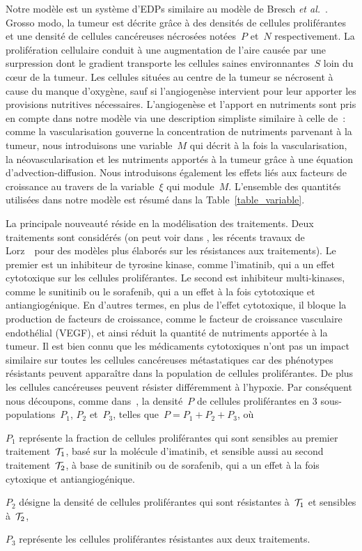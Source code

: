 \documentclass[main.tex]{subfiles}
\begin{document}
Notre modèle est un système d'EDPs similaire au modèle de 
Bresch {\it et al.}~\cite{Bresch2010}. Grosso modo, la tumeur est décrite grâce à des densités de cellules proliférantes et une densité de cellules cancéreuses nécrosées notées~$P$ et~$N$ respectivement. 
La prolifération cellulaire conduit à une augmentation de l'aire causée par une surpression dont le gradient transporte les cellules saines environnantes~$S$ loin du c\oe{}ur de la tumeur. 
Les cellules situées au centre de la tumeur se nécrosent à cause du manque d'oxygène, sauf si l'angiogenèse intervient pour leur apporter les provisions nutritives nécessaires.
L'angiogenèse et l'apport en nutriments sont pris en compte dans notre modèle via une description simpliste similaire à celle de~\cite{Fathallah2013,Billy2009545}: comme la vascularisation gouverne la concentration de nutriments parvenant à la tumeur, nous introduisons une variable~$M$ 
qui décrit à la fois la vascularisation, la néovascularisation et les nutriments apportés à la tumeur grâce à une équation d'advection-diffusion. 
Nous introduisons également les effets liés aux facteurs de croissance au travers de la variable~$\xi$ qui module~$M$. L'ensemble des quantités utilisées dans notre modèle est résumé dans la Table~\ref{table_variable}.


La principale nouveauté réside en la modélisation des traitements. Deux traitements sont considérés (on peut voir dans \cite{lorz2013}, les récents travaux de Lorz~\etal\ pour des modèles plus élaborés sur les résistances aux traitements). 
Le premier est un inhibiteur de tyrosine kinase, comme l'imatinib, qui a un effet cytotoxique 
sur les cellules proliférantes. Le second est inhibiteur multi-kinases, comme le sunitinib ou le sorafenib, qui a un effet à la fois cytotoxique et antiangiogénique. En d'autres termes, en plus de l'effet cytotoxique, il bloque la production de facteurs de croissance, comme le facteur de croissance vasculaire endothélial (VEGF), et ainsi réduit la quantité de nutriments apportée à la tumeur. 
Il est bien connu que les médicaments cytotoxiques n'ont pas un impact similaire sur toutes les cellules cancéreuses métastatiques car des phénotypes résistants peuvent apparaître dans la population de cellules proliférantes. De plus les cellules cancéreuses peuvent résister différemment à l'hypoxie. Par conséquent nous découpons, comme dans~\cite{Bresch2009}, la densité~$P$ de cellules proliférantes en 3 sous-populations~$P_1$, $P_2$ et~$P_3$, telles  que~$P=P_1+P_2+P_3$, où
\begin{myitemize}
\item $P_1$ représente la fraction de cellules proliférantes qui sont sensibles au premier traitement~${\mathcal T_1}$, basé sur la molécule d'imatinib, et sensible aussi au second traitement~${\mathcal T_2}$, à base de sunitinib ou de sorafenib, qui a un effet à la fois cytoxique et antiangiogénique. 
\item $P_2$ désigne la densité de cellules proliférantes qui sont résistantes à~${\mathcal T_1}$ et sensibles à~${\mathcal T_2}$,
\item $P_3$ représente les cellules proliférantes résistantes aux deux traitements. 
\end{myitemize}
\end{document}
